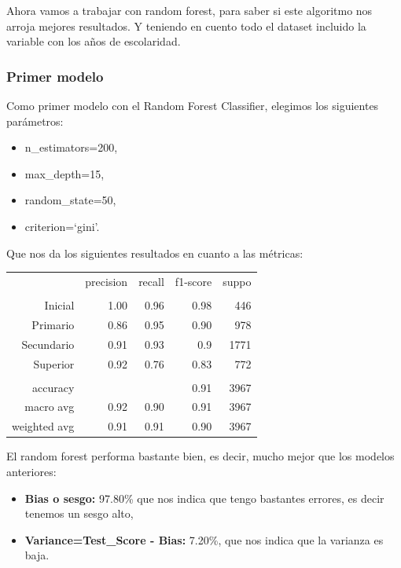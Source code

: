 \documentclass[a4paper]{article}
\begin{document}
        Ahora vamos a trabajar con random forest, para saber si este algoritmo nos arroja mejores resultados. Y teniendo en cuento todo el dataset incluido la variable con los años de escolaridad. 

        \subsubsection{Primer modelo}

            Como primer modelo con el Random Forest Classifier, elegimos los siguientes parámetros:
            \begin{itemize}
                \item n\_estimators=200,
                \item max\_depth=15,
                \item random\_state=50,
                \item criterion=`gini'.
            \end{itemize}

            Que nos da los siguientes resultados en cuanto a las métricas:
            \begin{table}[H]
                \centering
                \begin{tabular}{rrrrr}
                    ~ & precision & recall & f1-score & suppo \\
                    & & & & \\
                    Inicial    & 1.00 & 0.96 & 0.98 & 446 \\
                    Primario   & 0.86 & 0.95 & 0.90 & 978 \\
                    Secundario & 0.91 & 0.93 & 0.9 & 1771 \\
                    Superior   & 0.92 & 0.76 & 0.83 & 772 \\
                    & & & & \\
                    accuracy & & & 0.91 & 3967 \\
                    macro avg & 0.92 & 0.90 & 0.91 & 3967 \\
                    weighted avg & 0.91 & 0.91 & 0.90 & 3967 \\
                \end{tabular}
            \end{table}

             El random forest performa bastante bien, es decir, mucho mejor que los modelos anteriores:
             \begin{itemize}
                \item \textbf{Bias o sesgo:} 97.80\% que nos indica que tengo bastantes errores, es decir tenemos un sesgo alto,
                \item \textbf{Variance=Test\_Score - Bias:} 7.20\%, que nos indica que la varianza es baja.
             \end{itemize}
\end{document}
